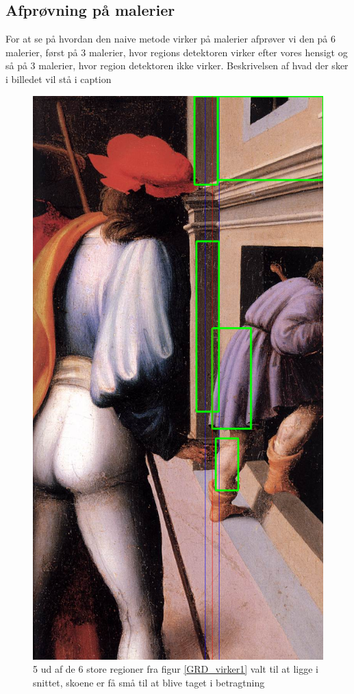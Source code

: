 \subsection{Afprøvning på malerier}
For at se på hvordan den naive metode virker på malerier afprøver vi den
på 6 malerier, først på 3 malerier, hvor regions detektoren virker
efter vores hensigt og så på 3 malerier, hvor region detektoren ikke
virker. Beskrivelsen af hvad der sker i billedet vil stå i caption


\begin{figure}[h!!]
	\begin{center}
		\includegraphics[scale=0.3,angle=0]{afsnit/afprovning/billeder/naive_losning/naiv_kfarver_sdetaljer.png}
	\end{center}
	\caption[]{5 ud af de 6 store regioner fra figur \ref{GRD_virker1} valt til at ligge i snittet, skoene er få små til at blive taget i betragtning}
	\label{naiv_kfarver_sdetaljer}
\end{figure}

